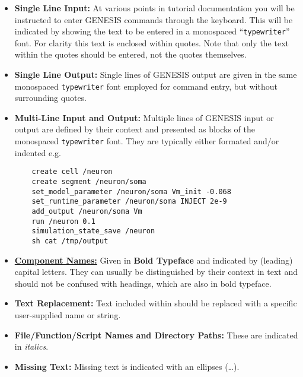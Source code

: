 \documentclass[12pt]{article}
\begin{document}
\begin{itemize}

\item {\bf Single Line Input:} At various points in tutorial documentation you will be instructed to enter GENESIS commands through the keyboard. This will be indicated by showing the text to be entered in a monospaced ``{\tt typewriter}'' font. For clarity this text is enclosed within quotes. Note that only the text within the quotes should be entered, not the quotes themselves.

\item {\bf Single Line Output:} Single lines of GENESIS output are given in the same monospaced {\tt typewriter} font employed for command entry, but without surrounding quotes.

\item {\bf Multi-Line Input and Output:} Multiple lines of GENESIS input or output are defined by their context and presented as blocks of the monospaced {\tt typewriter} font. They are typically either formated and/or indented e.g.

\begin{verbatim}
    create cell /neuron
    create segment /neuron/soma
    set_model_parameter /neuron/soma Vm_init -0.068
    set_runtime_parameter /neuron/soma INJECT 2e-9
    add_output /neuron/soma Vm
    run /neuron 0.1
    simulation_state_save /neuron
    sh cat /tmp/output
\end{verbatim}

\item \href{../reserved-words/reserved-words.tex}{\bf Component Names:} Given in {\bf Bold Typeface} and indicated by (leading) capital letters. They can usually be distinguished by their context in text and should not be confused with headings, which are also in bold typeface.

\item {\bf Text Replacement:} Text included within {\tt <angle brackets>} should be replaced with a specific user-supplied name or string.

\item {\bf File/Function/Script Names and Directory Paths:} These are indicated in {\it italics}.

\item {\bf Missing Text:} Missing text is indicated with an ellipses (\ldots).

\end{itemize}
\end{document}
